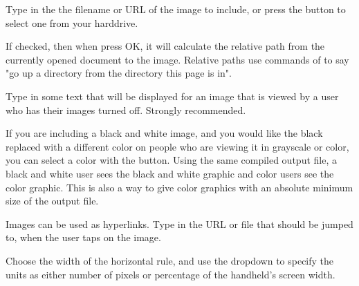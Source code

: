 
 Type in the the filename or URL of the 
image to include, or press the  button to 
select one from your harddrive.  

 If checked, then
when press OK, it will calculate the relative path from the currently opened
document to the image. Relative paths use commands of  to say "go 
up a directory from the directory this page is in". \notimplemented

 Type in some text that will be 
displayed for an image that is viewed by a \brandingapplicationsuitename user who has their images 
turned off. Strongly recommended.

 If you are including a black and white image, 
and you would like the black replaced with a different color on people who 
are viewing it in grayscale or color, you can select a color with the 
 button. Using the same compiled output file, 
a black and white user sees the black and white graphic and color users see 
the color graphic. This is also a way to give color graphics with an absolute 
minimum size of the output file.

 Images can be used as hyperlinks. Type in 
the URL or file that should be jumped to, when the user taps on the image.  


 Choose the width of the horizontal rule, and 
use the dropdown to specify the units as either number of pixels or 
percentage of the handheld's screen width.  

